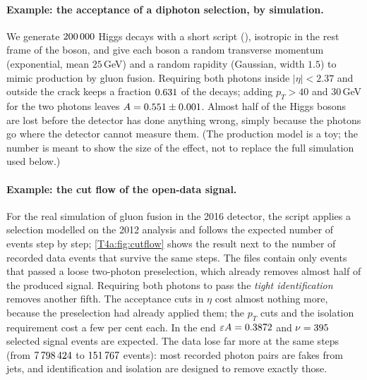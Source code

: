 \paragraph{Example: the acceptance of a diphoton selection, by simulation.}
We generate $\num{200000}$ Higgs decays with a short script (), isotropic in the rest frame of the boson, and give each boson a random transverse momentum (exponential, mean $25$\,GeV) and a random rapidity (Gaussian, width $1.5$) to mimic production by gluon fusion. Requiring both photons inside $\lvert\eta\rvert<2.37$ and outside the crack keeps a fraction $\tfouraR{3}{\TfAeta}$ of the decays; adding $p_T>40$ and $30$\,GeV for the two photons leaves $A=\tfouraR{3}{\TfAall}\pm\tfouraR{3}{\TfAerr}$. Almost half of the Higgs bosons are lost before the detector has done anything wrong, simply because the photons go where the detector cannot measure them. (The production model is a toy; the number is meant to show the size of the effect, not to replace the full simulation used below.)

\paragraph{Example: the cut flow of the open-data signal.}
For the real simulation of gluon fusion in the 2016 detector, the script  applies a selection modelled on the 2012 analysis and follows the expected number of events step by step; \cref{T4a:fig:cutflow} shows the result next to the number of recorded data events that survive the same steps. The files contain only events that passed a loose two-photon preselection, which already removes almost half of the produced signal. Requiring both photons to pass the \emph{tight identification}  removes another fifth. The acceptance cuts in $\eta$ cost almost nothing more, because the preselection had already applied them; the $p_T$ cuts and the isolation requirement  cost a few per cent each. In the end $\varepsilon A=0.3872$ and $\nu=395$ selected signal events are expected. The data lose far more at the same steps (from $\num{7798424}$ to $\num{151767}$ events): most recorded photon pairs are fakes from jets, and identification and isolation are designed to remove exactly those.

